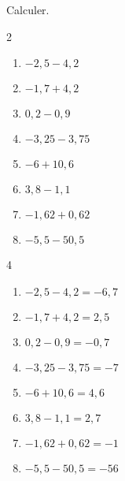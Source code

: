 \begin{exercice*}
    Calculer.
    \begin{multicols}2
        \begin{enumerate}
            \item $ -2,5-4,2 $
            \item $ -1,7+4,2 $
            \item $ 0,2-0,9 $
            \item $ -3,25-3,75 $
            \item $ -6+10,6 $
            \item $ 3,8-1,1 $
            \item $ -1,62+0,62 $
            \item $ -5,5-50,5 $
        \end{enumerate}
    \end{multicols}    
\end{exercice*}
\begin{corrige}
    \phantom{rrr}    
    \begin{multicols}4
        \begin{enumerate}
            \item $ -2,5-4,2 = -6,7$
            \item $ -1,7+4,2 = 2,5$
            \item $ 0,2-0,9 = -0,7$
            \item $ -3,25-3,75 = -7$
            \item $ -6+10,6 = 4,6$
            \item $ 3,8-1,1 = 2,7$
            \item $ -1,62+0,62 = -1$
            \item $ -5,5-50,5 = -56$
        \end{enumerate}
    \end{multicols}
\end{corrige}